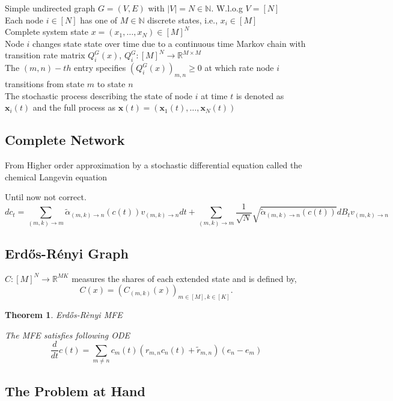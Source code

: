 \documentclass{article}
\newtheorem{theorem}{Theorem}
\newcommand{\R}{\mathbb{R}}
\newcommand{\N}{\mathbb{N}}
\newcommand{\fatx}{\boldsymbol{x}}
\begin{document}
Simple undirected graph $G=(V,E)$ with $|V| =N \in \N$.
W.l.o.g $V=[N]$ \\
Each node $i\in [N]$ has one of $M\in\N$ discrete states, i.e., $x_i \in [M]$ \\
Complete system state $x=(x_1,\dots ,x_N) \in [M]^N$ \\

Node $i$ changes state state over time due to a continuous time Markov chain with transition rate matrix
$Q_i^G(x)$, $Q_i^G:[M]^N \to \R^{M\times M}$\\
The $(m,n)-th$ entry specifies $(Q_i^G(x))_{m,n} \geq 0$ at which rate node $i$ transitions from state $m$ to state $n$\\
The stochastic process describing the state of node $i$ at time $t$ is denoted as $\fatx_i (t)$ and the full process as $\fatx (t) = (\fatx_1(t),\dots,\fatx_N(t))$




\subsection{Complete Network}

From \cite{Niemann2021} Higher order approximation by a stochastic differential equation called the chemical Langevin equation

Until now not correct.
\begin{equation}
    dc_t = \sum_{(m,k)\to m} \tilde\alpha_{(m,k) \to n} (c(t)) v_{(m,k)\to n} dt + \sum_{(m,k)\to m} \frac{1}{\sqrt{N}}\sqrt{\tilde\alpha_{(m,k) \to n} (c(t))} dB_t v_{(m,k)\to n}
\end{equation}

\subsection{Erdős-Rényi Graph}

$C:[M]^N \to \mathbb{R}^{MK}$ measures the shares of each extended state and is defined by,
\begin{equation}
    C(x) = \left(  C_{(m,k)}(x) \right)_{m\in[M],k\in[K]}.
\end{equation}

\begin{theorem}{Erdős-Rènyi MFE}

The MFE satisfies following ODE
    \begin{equation}
        \frac{d}{dt}c(t) = \sum_{m\neq n} c_m(t) (r_{m,n} c_n(t) + \tilde{r}_{m,n})(e_n - e_m)
    \end{equation}

\end{theorem}


\subsection{The Problem at Hand}




\printbibliography
\end{document}
